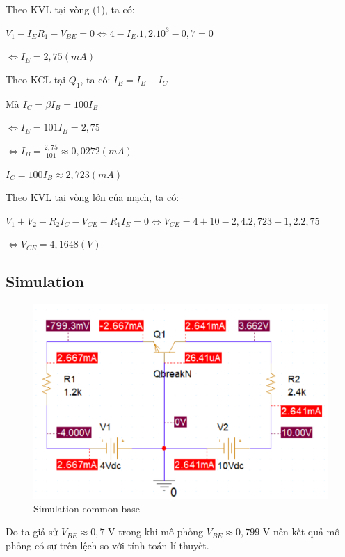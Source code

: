 Theo KVL tại vòng (1), ta có:

\(V_1 - I_{E}R_1 - V_{BE} = 0 \iff 4 - I_{E}.1,2.10^3 - 0,7 = 0\)

\(\iff I_{E} = 2,75 (mA)\)

Theo KCL tại \(Q_1\), ta có: \(I_E = I_B + I_C\)

Mà \(I_C = \beta I_B = 100I_B\)

\(\iff I_E = 101I_B = 2,75\)

\(\iff I_B = \frac{2,75}{101} \approx 0,0272 (mA)\)

\(I_C = 100I_B \approx 2,723 (mA) \)

Theo KVL tại vòng lớn của mạch, ta có:

\(V_1 + V_2 - R_2I_C - V_{CE} - R_1I_E = 0 \iff V_{CE}= 4 + 10 - 2,4.2,723 -1,2.2,75\)

\(\iff V_{CE} = 4,1648 (V)\)

\subsection{Simulation}

\begin{figure}[ht]
    \centering
    \includegraphics[scale=0.33]{graphics/ex10/f3.png}
    \caption{Simulation common base}
\end{figure}

Do ta giả sử \(V_{BE} \approx 0,7 \) V trong khi mô phỏng \(V_{BE} \approx 0,799 \) V nên kết quả mô phỏng có sự trên lệch so với tính toán lí thuyết.
\pagebreak
